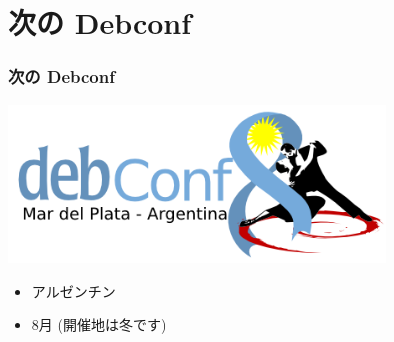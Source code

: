 \documentclass[cjk,dvipdfmx,12pt]{beamer}
\begin{document}
\section{次の Debconf}
\begin{frame} 
\frametitle{次の Debconf }
\begin{center}
\includegraphics[width=10cm]{image200707/debconf8.png}  
 \end{center}  
\begin{itemize}
    \item アルゼンチン
    \item 8月 (開催地は冬です)
  \end{itemize}
\end{frame}
\end{document}
